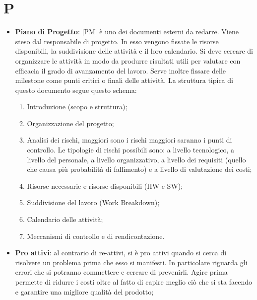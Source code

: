 %
%
%
%

\section{P}

\begin{itemize}
	\item \textbf{Piano di Progetto}: [PM] è uno dei documenti esterni da redarre. Viene steso dal responsabile di progetto. \newline
In esso vengono fissate le risorse disponibili, la suddivisione delle attività e il loro calendario. \newline
Si deve cercare di organizzare le attività in modo da produrre risultati utili per valutare con efficacia il grado di avanzamento del lavoro. \newline
Serve inoltre fissare delle milestone come punti critici o finali delle attività. \newline
La struttura tipica di questo documento segue questo schema:
	\begin{enumerate}
		\item Introduzione (scopo e struttura);
		\item Organizzazione del progetto;
		\item Analisi dei rischi, maggiori sono i rischi maggiori saranno i punti di controllo. \newline
Le tipologie di rischi possibili sono: a livello tecnologico, a livello del personale, a livello organizzativo, a livello dei requisiti (quello che causa più probabilità di fallimento) e a livello di valutazione dei costi;
		\item Risorse necessarie e risorse disponibili (HW e SW);
		\item Suddivisione del lavoro (Work Breakdown);
		\item Calendario delle attività;
		\item Meccanismi di controllo e di rendicontazione.
	\end{enumerate}
 

	\item \textbf{Pro attivi}: al contrario di re-attivi, si è pro attivi quando si cerca di risolvere un problema prima che esso si manifesti. In particolare riguarda gli errori che si potranno commettere e cercare di prevenirli. \newline
Agire prima permette di ridurre i costi oltre al fatto di capire meglio ciò che si sta facendo e garantire una migliore qualità del prodotto;


\end{itemize}
